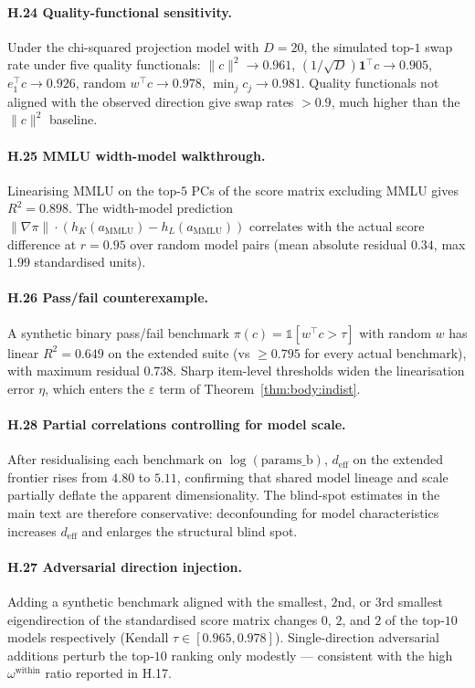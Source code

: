 \documentclass{article}
\begin{document}
\paragraph{H.24 Quality-functional sensitivity.}
Under the chi-squared projection model with $D = 20$, the simulated
top-$1$ swap rate under five quality functionals: $\|c\|^2 \to 0.961$,
$(1/\sqrt D) \mathbf{1}^\top c \to 0.905$, $e_1^\top c \to 0.926$,
random $w^\top c \to 0.978$, $\min_j c_j \to 0.981$. Quality
functionals not aligned with the observed direction give swap rates
$> 0.9$, much higher than the $\|c\|^2$ baseline.

\paragraph{H.25 MMLU width-model walkthrough.}
Linearising MMLU on the top-$5$ PCs of the score matrix excluding
MMLU gives $R^2 = 0.898$. The width-model prediction
$\|\nabla\pi\| \cdot (h_K(a_{\mathrm{MMLU}}) - h_L(a_{\mathrm{MMLU}}))$
correlates with the actual score difference at $r = 0.95$ over
random model pairs (mean absolute residual $0.34$, max $1.99$
standardised units).

\paragraph{H.26 Pass/fail counterexample.}
A synthetic binary pass/fail benchmark $\pi(c) = \mathbb{1}[w^\top c
> \tau]$ with random $w$ has linear $R^2 = 0.649$ on the extended
suite (vs $\ge 0.795$ for every actual benchmark), with maximum
residual $0.738$. Sharp item-level thresholds widen the
linearisation error $\eta$, which enters the $\varepsilon$ term of
Theorem~\ref{thm:body:indist}.

\paragraph{H.28 Partial correlations controlling for model scale.}
After residualising each benchmark on $\log(\mathrm{params\_b})$,
$d_{\mathrm{eff}}$ on the extended frontier rises from $4.80$ to
$5.11$, confirming that shared model lineage and scale partially
deflate the apparent dimensionality. The blind-spot estimates in the
main text are therefore conservative: deconfounding for model
characteristics increases $d_{\mathrm{eff}}$ and enlarges the
structural blind spot.

\paragraph{H.27 Adversarial direction injection.}
Adding a synthetic benchmark aligned with the smallest, $2$nd, or
$3$rd smallest eigendirection of the standardised score matrix
changes $0$, $2$, and $2$ of the top-$10$ models respectively
(Kendall $\tau \in [0.965, 0.978]$). Single-direction adversarial
additions perturb the top-$10$ ranking only modestly --- consistent
with the high $\omega^{\mathrm{within}}$ ratio reported in H.17.
\end{document}
